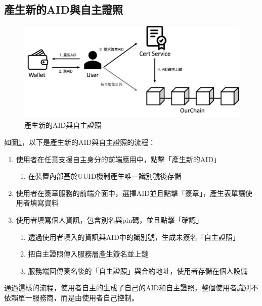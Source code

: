 \subsection{產生新的AID與自主證照}
\begin{figure}
  \centering
  \includegraphics[width=\linewidth, keepaspectratio]{figures/implement-1.png}
  \caption{產生新的AID與自主證照}
  \label{fig:implement-1}
\end{figure}
如圖\ref{fig:implement-1}，以下是產生新的AID與自主證照的流程：
\begin{enumerate}
  \item 使用者在任意支援自主身分的前端應用中，點擊「產生新的AID」
        \begin{enumerate}
          \item 在裝置內部基於UUID機制產生唯一識別號後存儲
        \end{enumerate}
  \item 使用者在簽章服務的前端介面中，選擇AID並且點擊「簽章」，產生表單讓使用者填寫資料
  \item 使用者填寫個人資訊，包含別名與pin碼，並且點擊「確認」
        \begin{enumerate}
          \item 透過使用者填入的資訊與AID中的識別號，生成未簽名「自主證照」
          \item 把自主證照傳入服務層產生簽名並上鏈
          \item 服務端回傳簽名後的「自主證照」與合約地址，使用者存儲在個人設備
        \end{enumerate}
\end{enumerate}
通過這樣的流程，使用者自主的生成了自己的AID和自主證照，整個使用者識別不依賴單一服務商，而是由使用者自己控制。
